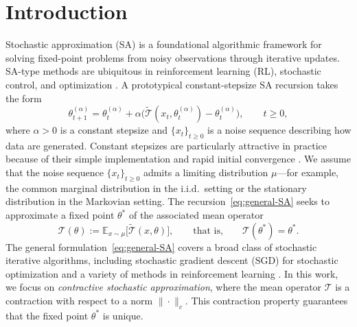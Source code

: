 \documentclass[11pt,letterpaper]{article}
\theoremstyle{plain}
\theoremstyle{definition}
\theoremstyle{remark}
\newcommand{\mT}{\mathcal{T}}
\newcommand{\tmT}{\widetilde{\mT}}
\begin{document}
\section{Introduction}\label{sec:Intro}
Stochastic approximation (SA) is a foundational algorithmic framework for
solving fixed-point problems from noisy observations through iterative
updates. SA-type methods are ubiquitous in reinforcement learning (RL),
stochastic control, and optimization
\citep{Bertsekas19-RL-book,Sutton18-RL-book,kushner2003-yin-sa-book,moulines2011non}.
A prototypical constant-stepsize SA recursion takes the form
\begin{equation}\label{eq:general-SA}
\theta_{t+1}^{(\alpha)}
=
\theta_t^{(\alpha)}
+
\alpha\bigl(
\tmT(x_t,\theta_t^{(\alpha)})
-
\theta_t^{(\alpha)}
\bigr),
\qquad t\geq 0,
\end{equation}
where $\alpha>0$ is a constant stepsize and $\{x_t\}_{t\geq 0}$ is a
noise sequence describing how data are generated. Constant stepsizes are
particularly attractive in practice because of their simple implementation
and rapid initial convergence
\citep{chen2020finite,zhang2024constant}. We assume that the noise sequence $\{x_t\}_{t \geq 0}$ admits a
limiting distribution $\mu$---for example, the common marginal distribution
in the i.i.d.\ setting or the stationary distribution in the Markovian
setting. The recursion~\eqref{eq:general-SA} seeks to approximate a fixed
point $\theta^*$ of the associated mean operator
\[
\mT(\theta)
:=
\mathbb{E}_{x\sim\mu}\bigl[\tmT(x,\theta)\bigr],
\qquad
\text{that is,}
\qquad
\mT(\theta^*)=\theta^*.
\]
The general formulation~\eqref{eq:general-SA} covers a broad class of
stochastic iterative algorithms, including stochastic gradient descent (SGD)
for stochastic optimization \citep{lan2020first} and a variety of
methods in reinforcement learning \citep{Sutton18-RL-book}. In this work, we
focus on \emph{contractive stochastic approximation}, where the mean operator
$\mT$ is a contraction with respect to a norm $\|\cdot\|_c$. This contraction
property guarantees that the fixed point $\theta^*$ is unique.
\end{document}
